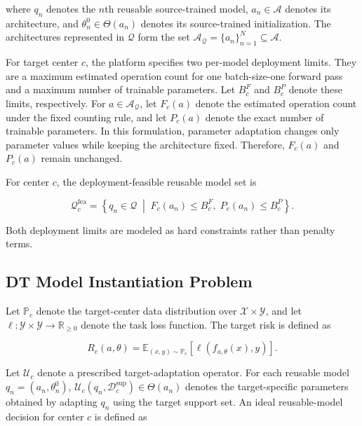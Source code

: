 \documentclass[a4paper,fleqn]{cas-sc}
\begin{document}
where $q_n$ denotes the $n$th reusable source-trained model,
$a_n\in\mathcal{A}$ denotes its architecture, and
$\theta_n^0\in\Theta(a_n)$ denotes its source-trained initialization. The
architectures represented in $\mathcal{Q}$ form the set
$\mathcal{A}_{\mathcal{Q}}=\{a_n\}_{n=1}^{N}\subseteq\mathcal{A}$.

For target center $c$, the platform specifies two per-model deployment
limits. They are a maximum estimated operation count for one batch-size-one
forward pass and a maximum number of trainable parameters. Let $B_c^{F}$ and $B_c^{P}$
denote these limits, respectively. For $a\in\mathcal{A}_{\mathcal{Q}}$, let
$F_c(a)$ denote the estimated operation count under the fixed counting rule,
and let $P_c(a)$ denote the exact number of trainable parameters. In this
formulation, parameter adaptation changes only parameter values while keeping
the architecture fixed. Therefore, $F_c(a)$ and $P_c(a)$ remain unchanged.

For center $c$, the deployment-feasible reusable model set is

\begin{equation}
\mathcal{Q}_{c}^{\mathrm{fea}}
=
\left\{
q_n\in\mathcal{Q}
\;\middle|\;
F_c(a_n)\leq B_c^{F},
\;
P_c(a_n)\leq B_c^{P}
\right\}.
\label{eq:feasible-candidate-set}
\end{equation}

Both deployment limits are modeled as hard constraints rather than penalty
terms.

\subsection{DT Model Instantiation Problem}

Let $\mathbb{P}_c$ denote the target-center data distribution over
$\mathcal{X}\times\mathcal{Y}$, and let
$\ell:\mathcal{Y}\times\mathcal{Y}\rightarrow\mathbb{R}_{\geq 0}$ denote the
task loss function. The target risk is defined as

\begin{equation}
R_c(a,\theta)
=
\mathbb{E}_{(x,y)\sim\mathbb{P}_c}
\left[
\ell(f_{a,\theta}(x),y)
\right].
\label{eq:target-risk}
\end{equation}

Let $\mathcal{U}_c$ denote a prescribed target-adaptation operator. For each
reusable model $q_n=(a_n,\theta_n^0)$,
$\mathcal{U}_c(q_n,\mathcal{D}_c^{\mathrm{sup}})\in\Theta(a_n)$ denotes
the target-specific parameters obtained by adapting $q_n$ using the target
support set. An ideal reusable-model decision for center $c$ is defined as
\end{document}
